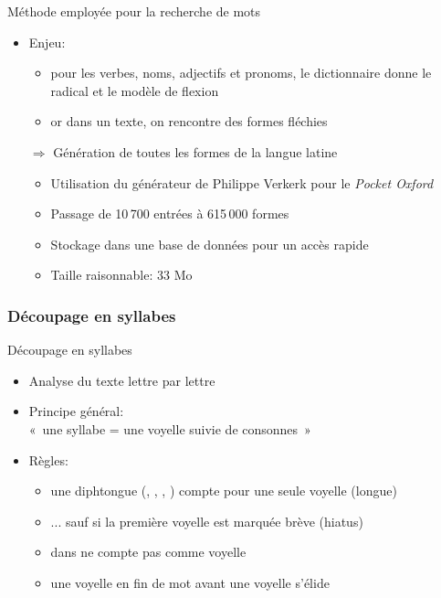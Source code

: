 \documentclass{beamer}
\newcommand{\lettre}[1]{\emph{\structure{#1}}}
\begin{document}
\begin{frame}{Méthode employée pour la recherche de mots}

\begin{itemize}

\item Enjeu:

\begin{itemize}
\item pour les verbes, noms, adjectifs et pronoms, le dictionnaire donne le radical et le modèle de flexion
\item or dans un texte, on rencontre des formes fléchies
\end{itemize}

\vfill

\item[$\Rightarrow$] Génération de toutes les formes de la langue latine

\begin{itemize}
\item Utilisation du générateur de Philippe Verkerk pour le \emph{Pocket Oxford}
\item Passage de 10\,700 entrées à 615\,000 formes
\item Stockage dans une base de données pour un accès rapide
\item Taille raisonnable: 33 Mo
\end{itemize}

\end{itemize}

\end{frame} %


\subsubsection{Découpage en syllabes}

\begin{frame}{Découpage en syllabes}

\begin{itemize}
\item Analyse du texte lettre par lettre
\item Principe général:\\ «~une syllabe = une voyelle suivie de consonnes~»
\item Règles:

\begin{itemize}
\item une diphtongue (\lettre{ae}, \lettre{oe}, \lettre{eu}, \lettre{au}) compte pour une seule voyelle (longue)
\item ... sauf si la première voyelle est marquée brève (hiatus)
\item \lettre{u} dans \lettre{qu} ne compte pas comme voyelle
\item une voyelle en fin de mot avant une voyelle s'élide
\end{itemize}

\end{itemize}
\end{frame} %
\end{document}

